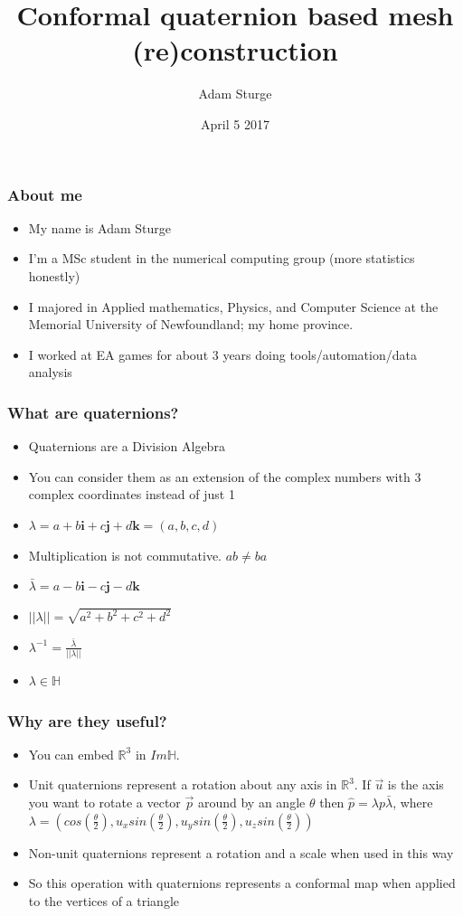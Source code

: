 \documentclass{beamer}
\title[] %
{Conformal quaternion based mesh (re)construction}
\author[] %
{Adam Sturge\inst{1}}
\institute[] %
{
  \inst{1}%
  Faculty of Computer Science\\
  University of Toronto
}
\date[] %
{April 5 2017}
\begin{document}
 
\frame{\titlepage}
 
\begin{frame}
\frametitle{About me}
\begin{itemize}
 \item My name is Adam Sturge
 \item I'm a MSc student in the numerical computing group (more statistics honestly)
 \item I majored in Applied mathematics, Physics, and Computer Science at the Memorial University of Newfoundland; my home province.
 \item I worked at EA games for about 3 years doing tools/automation/data analysis
\end{itemize}
\end{frame}

\begin{frame}
\frametitle{What are quaternions?}
\begin{itemize}
 \item Quaternions are a Division Algebra
 \item You can consider them as an extension of the complex numbers with 3 complex coordinates instead of just 1
 \item $\lambda = a + b\boldsymbol{i} + c\boldsymbol{j} + d\boldsymbol{k} = (a,b,c,d)$
 \item Multiplication is not commutative. $ab \neq ba$
 \item $\bar{\lambda} = a - b\boldsymbol{i} - c\boldsymbol{j} - d\boldsymbol{k}$
 \item $||\lambda|| = \sqrt{a^2 + b^2 + c^2 + d^2}$
 \item $\lambda^{-1} = \frac{\bar{\lambda}}{||\lambda||}$ 
 \item $\lambda \in \mathbb{H}$
\end{itemize}
\end{frame}

\begin{frame}
\frametitle{Why are they useful?}
\begin{itemize}
 \item You can embed $\mathbb{R}^{3}$ in $Im\mathbb{H}$. 
 \item Unit quaternions represent a rotation about any axis in $\mathbb{R}^{3}$. If $\vec{u}$ is the axis you want to rotate a vector $\vec{p}$ around by an angle $\theta$ then $\hat{p} = \lambda p \bar{\lambda}$, where $\lambda = (cos(\frac{\theta}{2}),u_{x}sin(\frac{\theta}{2}),u_{y}sin(\frac{\theta}{2}),u_{z}sin(\frac{\theta}{2}))$
 \item Non-unit quaternions represent a rotation and a scale when used in this way
 \item So this operation with quaternions represents a conformal map when applied to the vertices of a triangle
\end{itemize}
\end{frame}
\end{document}
